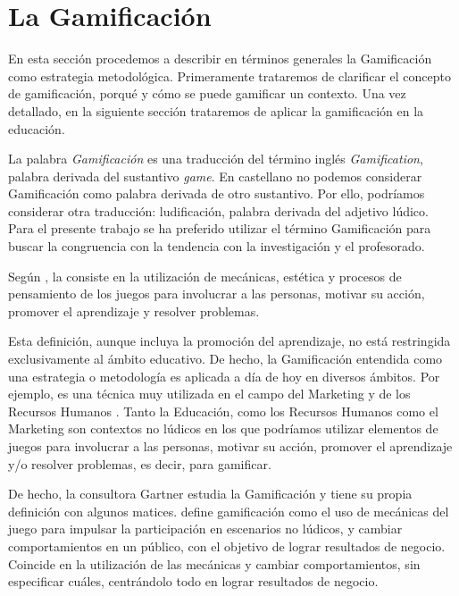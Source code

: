 
\section{La Gamificación}




En esta sección procedemos a describir en términos generales la Gamificación como estrategia metodológica.
%
Primeramente trataremos de clarificar el concepto de gamificación, porqué y cómo se puede gamificar un contexto.
%
Una vez detallado, en la siguiente sección trataremos de aplicar la gamificación en la educación.


La palabra \textit{Gamificación} es una traducción del término inglés \textit{Gamification}, palabra derivada del sustantivo \textit{game}.
%
En castellano no podemos considerar Gamificación como palabra derivada de otro sustantivo. Por ello, podríamos considerar otra traducción: ludificación, palabra derivada del adjetivo lúdico.
%
Para el presente trabajo se ha preferido utilizar el término Gamificación para buscar la congruencia con la tendencia con la investigación y el profesorado.



Según \cite{GamificationDef}, la  consiste en la utilización de mecánicas, estética y procesos de pensamiento de los juegos para involucrar a las personas, motivar su acción, promover el aprendizaje y resolver problemas.

Esta definición, aunque incluya la promoción del aprendizaje, no está restringida exclusivamente al ámbito educativo. 
%
De hecho, la Gamificación entendida como una estrategia o metodología es aplicada a día de hoy en diversos ámbitos. 
%
Por ejemplo, es una técnica muy utilizada en el campo del Marketing \cite{GamifyMark} y de los Recursos Humanos \cite{GamifyHR}.
%
Tanto la Educación, como los Recursos Humanos como el Marketing son contextos no lúdicos en los que podríamos utilizar elementos de juegos para involucrar a las personas, motivar su acción, promover el aprendizaje y/o resolver problemas, es decir, para gamificar.

De hecho, la consultora Gartner estudia la Gamificación y tiene su propia definición con algunos matices.
%
\cite{Gartner} define gamificación como el uso de mecánicas del juego para impulsar la participación en escenarios no lúdicos, y cambiar comportamientos en un público, con el objetivo de lograr resultados de negocio.
%
Coincide en la utilización de las mecánicas y cambiar comportamientos, sin especificar cuáles, centrándolo todo en lograr resultados de negocio.

